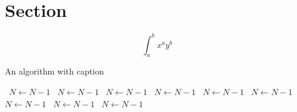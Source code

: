 \documentclass[a4paper]{article}
\begin{document}
\section{Section}

\[ \int_{a}^{b}{x^{a}y^{b}} \]

\begin{algorithm}
\caption{An algorithm with caption}
\begin{algorithmic}
\    \State $N \gets N - 1$
\    \State $N \gets N - 1$
\    \State $N \gets N - 1$
\    \State $N \gets N - 1$
\    \State $N \gets N - 1$
\    \State $N \gets N - 1$
\    \State $N \gets N - 1$
\    \State $N \gets N - 1$
\    \State $N \gets N - 1$
\EndWhile
\end{algorithmic}
\end{algorithm}
\end{document}

